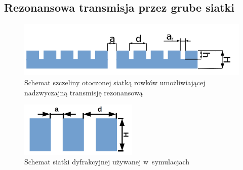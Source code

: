 \subsection{Rezonansowa transmisja przez grube siatki}
\label{subart:rezo-grating}

\begin{figure}[tb]
	\centering
	\includegraphics[width=1.0\textwidth]{images/thz/schemat-1szczelina.png}
	\caption{Schemat szczeliny otoczonej siatką rowków umożliwiającej nadzwyczajną transmisję rezonansową}
	\label{fig:szczelina-schem}
\end{figure}

\begin{figure}
	\includegraphics[width=0.5\textwidth]{images/thz/schemat-siatka.png}
	\caption{Schemat siatki dyfrakcyjnej używanej w~symulacjach}
	\centering
	\label{fig:rezo-siat-H}
\end{figure}

